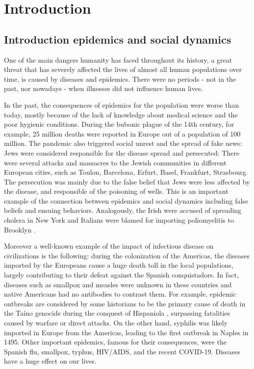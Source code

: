 \part{Introduction}

\chapter{Introduction epidemics and social dynamics}

One of the main dangers humanity has faced throughout its history, a great threat that has severely affected the lives of almost all human populations over time, is caused by diseases and epidemics. There were no periods - not in the past, nor nowadays - when illnesses did not influence human lives. 

In the past, the consequences of epidemics for the population were worse than today, mostly because of the lack of knowledge about medical science and the poor hygienic conditions. During the bubonic plague of the 14th century, for example, 25 million deaths were reported in Europe out of a population of 100 million. The pandemic also triggered social unrest and the spread of fake news: Jews were considered responsible for the disease spread and persecuted: There were several attacks and massacres to the Jewish communities in different European cities, such as Toulon, Barcelona, Erfurt, Basel, Frankfurt, Strasbourg. The persecution was mainly due to the false belief that Jews were less affected by the disease, and responsible of the poisoning of wells. This is an important example of the connection between epidemics and social dynamics including false beliefs and ensuing behaviors. Analogously, the Irish were accused of spreading cholera in New York and Italians were blamed for importing poliomyelitis to Brooklyn \cite{risse1988epidemics}. 

Moreover a well-known example of the impact of infectious disease on civilizations is the following: during the colonization of the Americas, the diseases imported by the Europeans cause a huge death toll in the local populations, largely contributing to their defeat against the Spanish conquistadors. In fact, diseases such as smallpox and measles were unknown in these countries and native Americans had no antibodies to contrast them. For example, epidemic outbreaks are considered by some historians to be the primary cause of death in the Taíno genocide during the conquest of Hispaniola \cite{keegan1992destruction}, surpassing fatalities caused by warfare or direct attacks. 
On the other hand, syphilis was likely imported in Europe from the Americas, leading to the first outbreak in Naples in 1495.
Other important epidemics, famous for their consequences, were the Spanish flu, smallpox, typhus, HIV/AIDS, and the recent COVID-19. Diseases have a huge effect on our lives.\\

